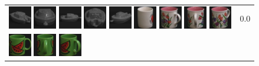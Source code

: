 \begin{figure}[tbp]
\begin{center}
\begin{tabular}{m{11cm} | m{3cm} |}
\includegraphics[width=1cm]{coil/beeld-25.eps}
\includegraphics[width=1cm]{coil/beeld-28.eps}
\includegraphics[width=1cm]{coil/beeld-27.eps}
\includegraphics[width=1cm]{coil/beeld-26.eps}
\includegraphics[width=1cm]{coil/beeld-29.eps}
\includegraphics[width=1cm]{coil/beeld-38.eps}
\includegraphics[width=1cm]{coil/beeld-10.eps}
\includegraphics[width=1cm]{coil/beeld-11.eps}
\includegraphics[width=1cm]{coil/beeld-9.eps}
& {\scriptsize 0.0}
\\
\includegraphics[width=1cm]{coil/beeld-30.eps}
\includegraphics[width=1cm]{coil/beeld-35.eps}
\includegraphics[width=1cm]{coil/beeld-34.eps}

\end{tabular}
\end{center}
\end{figure}
